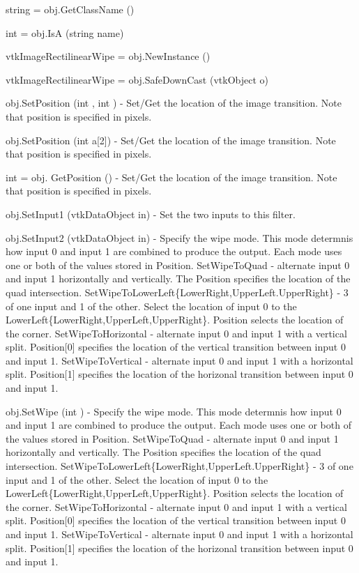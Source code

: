 \begin{DoxyItemize}
\item {\ttfamily string = obj.\-Get\-Class\-Name ()}  
\item {\ttfamily int = obj.\-Is\-A (string name)}  
\item {\ttfamily vtk\-Image\-Rectilinear\-Wipe = obj.\-New\-Instance ()}  
\item {\ttfamily vtk\-Image\-Rectilinear\-Wipe = obj.\-Safe\-Down\-Cast (vtk\-Object o)}  
\item {\ttfamily obj.\-Set\-Position (int , int )} -\/ Set/\-Get the location of the image transition. Note that position is specified in pixels.  
\item {\ttfamily obj.\-Set\-Position (int a\mbox{[}2\mbox{]})} -\/ Set/\-Get the location of the image transition. Note that position is specified in pixels.  
\item {\ttfamily int = obj. Get\-Position ()} -\/ Set/\-Get the location of the image transition. Note that position is specified in pixels.  
\item {\ttfamily obj.\-Set\-Input1 (vtk\-Data\-Object in)} -\/ Set the two inputs to this filter.  
\item {\ttfamily obj.\-Set\-Input2 (vtk\-Data\-Object in)} -\/ Specify the wipe mode. This mode determnis how input 0 and input 1 are combined to produce the output. Each mode uses one or both of the values stored in Position. Set\-Wipe\-To\-Quad -\/ alternate input 0 and input 1 horizontally and vertically. The Position specifies the location of the quad intersection. Set\-Wipe\-To\-Lower\-Left\{Lower\-Right,Upper\-Left.\-Upper\-Right\} -\/ 3 of one input and 1 of the other. Select the location of input 0 to the Lower\-Left\{Lower\-Right,Upper\-Left,Upper\-Right\}. Position selects the location of the corner. Set\-Wipe\-To\-Horizontal -\/ alternate input 0 and input 1 with a vertical split. Position\mbox{[}0\mbox{]} specifies the location of the vertical transition between input 0 and input 1. Set\-Wipe\-To\-Vertical -\/ alternate input 0 and input 1 with a horizontal split. Position\mbox{[}1\mbox{]} specifies the location of the horizonal transition between input 0 and input 1.  
\item {\ttfamily obj.\-Set\-Wipe (int )} -\/ Specify the wipe mode. This mode determnis how input 0 and input 1 are combined to produce the output. Each mode uses one or both of the values stored in Position. Set\-Wipe\-To\-Quad -\/ alternate input 0 and input 1 horizontally and vertically. The Position specifies the location of the quad intersection. Set\-Wipe\-To\-Lower\-Left\{Lower\-Right,Upper\-Left.\-Upper\-Right\} -\/ 3 of one input and 1 of the other. Select the location of input 0 to the Lower\-Left\{Lower\-Right,Upper\-Left,Upper\-Right\}. Position selects the location of the corner. Set\-Wipe\-To\-Horizontal -\/ alternate input 0 and input 1 with a vertical split. Position\mbox{[}0\mbox{]} specifies the location of the vertical transition between input 0 and input 1. Set\-Wipe\-To\-Vertical -\/ alternate input 0 and input 1 with a horizontal split. Position\mbox{[}1\mbox{]} specifies the location of the horizonal transition between input 0 and input 1.  

\end{DoxyItemize}
